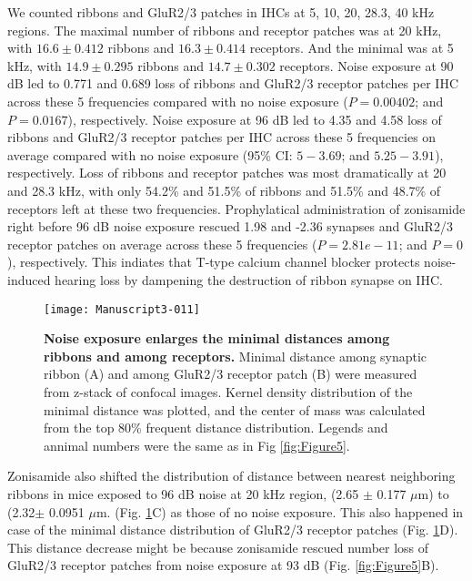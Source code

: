 \documentclass[11pt]{article}
\begin{document}
We counted ribbons and GluR2/3 patches in IHCs at 5, 10, 20, 28.3, 40 kHz regions. The maximal number of ribbons and receptor patches was at 20 kHz, with 
$16.6 \pm 
0.412$ ribbons and 
$16.3 \pm 
0.414$ receptors. 
And the minimal was at 5 kHz, with 
$14.9 \pm 
0.295$ ribbons and 
$14.7 \pm 
0.302$ receptors. 
Noise exposure at 90 dB led to 0.771 and 0.689 loss of ribbons and GluR2/3 receptor patches per IHC across these 5 frequencies compared with no noise exposure 
($P=0.00402$; and 
 $P=0.0167$), respectively. Noise exposure at 96 dB led to 4.35 and 4.58 loss of ribbons and GluR2/3 receptor patches per IHC across these 5 frequencies on average compared with no noise exposure 
(95\% CI: $5 - 3.69$; and 
 $5.25 - 3.91$), respectively. Loss of ribbons and receptor patches was most dramatically at 20 and 28.3 kHz, with only 54.2\% and 51.5\% of ribbons and 
 51.5\% and 48.7\% of receptors left at these two frequencies.
 Prophylatical administration of zonisamide right before 96 dB noise exposure rescued 1.98 and -2.36 synapses and GluR2/3 receptor patches on average across these 5 frequencies 
 ($P=2.81e-11$; and 
 $P=0$), respectively. This indiates that T-type calcium channel blocker protects noise-induced hearing loss by dampening the destruction of ribbon synapse on IHC. 




\begin{figure}[ht!]
\centering
\texttt{[image: Manuscript3-011]}
\caption{{\bf {Noise exposure enlarges the minimal distances among ribbons and among receptors.}}  Minimal distance among synaptic ribbon (A) and among GluR2/3 receptor patch (B) were measured from z-stack of confocal images. Kernel density distribution of the minimal distance was plotted, and the center of mass was calculated from the top 80\% frequent distance distribution. Legends and annimal numbers were the same as in Fig \ref{fig:Figure5}.}
\label{fig:Figure6}
\end{figure}


Zonisamide also shifted the distribution of distance between nearest neighboring ribbons in mice exposed to 96 dB noise at 20 kHz region,
(2.65 $\pm$ 0.177 $\mu$m) to 
(2.32$\pm$ 0.0951 $\mu$m. (Fig. \ref{fig:Figure6}C) as those of no noise exposure. This also happened in case of the minimal distance distribution of GluR2/3 receptor patches (Fig. \ref{fig:Figure6}D). This distance decrease might be because zonisamide rescued number loss of GluR2/3 receptor patches from noise exposure at 93 dB (Fig. \ref{fig:Figure5}B). 
\end{document}
